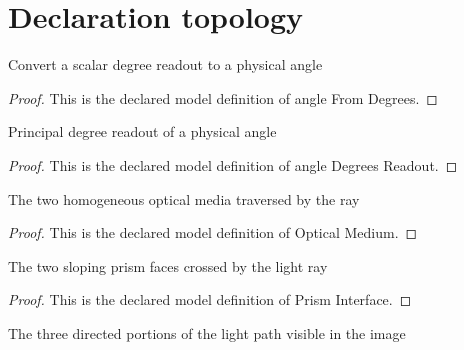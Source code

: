 \section{Declaration topology}
\begin{definition}
  \label{def:physics:phyx-mini-0146:phyxminiproblems-problemphyxmini0146-anglefromdegrees}
  Convert a scalar degree readout to a physical angle
\end{definition}
\begin{proof}
  This is the declared model definition of angle From Degrees.
\end{proof}
\begin{definition}
  \label{def:physics:phyx-mini-0146:phyxminiproblems-problemphyxmini0146-angledegreesreadout}
  Principal degree readout of a physical angle
\end{definition}
\begin{proof}
  This is the declared model definition of angle Degrees Readout.
\end{proof}
\begin{definition}
  \label{def:physics:phyx-mini-0146:phyxminiproblems-problemphyxmini0146-opticalmedium}
  The two homogeneous optical media traversed by the ray
\end{definition}
\begin{proof}
  This is the declared model definition of Optical Medium.
\end{proof}
\begin{definition}
  \label{def:physics:phyx-mini-0146:phyxminiproblems-problemphyxmini0146-prisminterface}
  The two sloping prism faces crossed by the light ray
\end{definition}
\begin{proof}
  This is the declared model definition of Prism Interface.
\end{proof}
\begin{definition}
  \label{def:physics:phyx-mini-0146:phyxminiproblems-problemphyxmini0146-raysegment}
  The three directed portions of the light path visible in the image
\end{definition}
